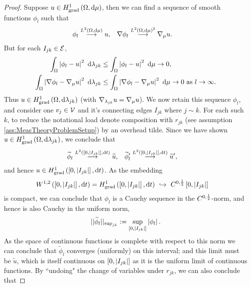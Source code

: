 \begin{proof}
	Suppose $u\in H^1_\mathrm{grad}\left( \Omega, \mathrm{d}\mu \right)$, then we can find a sequence of smooth functions $\phi_l$ such that
	\begin{align*}
		\phi_l \overset{L^{2}\left( \Omega,\mathrm{d}\mu \right)}{\longrightarrow} u, 
		&\quad \nabla\phi_l \overset{L^{2}\left( \Omega,\mathrm{d}\mu \right)^2}{\longrightarrow} \nabla_\mu u.
	\end{align*}
	But for each $I_{jk}\in \mathcal{E}$,
	\begin{align*}
		\int_{\Omega}\left\lvert  \phi_l - u  \right\rvert^2 \ \mathrm{d}\lambda_{jk}
		&\leq \int_{\Omega}\left\lvert  \phi_l - u  \right\rvert^2 \ \mathrm{d}\mu \rightarrow 0, \\
		\int_{\Omega}\left\lvert  \nabla\phi_l - \nabla_\mu u  \right\rvert^2 \ \mathrm{d}\lambda_{jk}
		&\leq \int_{\Omega}\left\lvert  \nabla\phi_l - \nabla_\mu u  \right\rvert^2 \ \mathrm{d}\mu \rightarrow 0 \ \text{as} \ l \rightarrow\infty.
	\end{align*}
	Thus $u\in H^1_\mathrm{grad}\left( \Omega, \mathrm{d}\lambda_{jk} \right)$ (with $\nabla_{\lambda_{jk}}u = \nabla_\mu u$).
	We now retain this sequence $\phi_l$, and consider one $v_j\in \mathcal{V}$ and it's connecting edges $I_{jk}$ where $j\sim k$.
	For each such $k$, to reduce the notational load denote composition with $r_{jk}$ (see assumption \ref{ass:MeasTheoryProblemSetup}) by an overhead tilde.
	Since we have shown $u\in H^1_\mathrm{grad}\left( \Omega, \mathrm{d}\lambda_{jk} \right)$, we conclude that 
	\begin{align*}
		\widetilde{\phi}_l \overset{L^{2}\left( \left[ 0,\left\lvert I_{jk} \right\rvert \right],\mathrm{d}t \right)}{\longrightarrow} \widetilde{u}, 
		&\quad \widetilde{\phi}'_l \overset{L^{2}\left( \left[ 0,\left\lvert I_{jk} \right\rvert \right],\mathrm{d}t \right)}{\longrightarrow} \widetilde{u}',
	\end{align*}
	and hence $u\in H^1_\mathrm{grad}\left( \left[ 0,\left\lvert I_{jk} \right\rvert \right], \mathrm{d}t \right)$.
	As the embedding 
	\begin{align*}
		W^{1,2}\bracs{\interval{I_{jk}}, \md t} = \gradSob{\interval{I_{jk}}}{t} \ &\hookrightarrow \ C^{0,\recip{2}}\interval{I_{jk}}
	\end{align*}
	is compact, we can conclude that $\phi_l$ is a Cauchy sequence in the $C^{0,\frac{1}{2}}$-norm, and hence is also Cauchy in the uniform norm,
	\begin{align*}
		\lvert\lvert \widetilde{\phi}_l \rvert\rvert_{\mathrm{sup}_{jk}} := \sup_{\left[ 0,\left\lvert I_{jk} \right\rvert \right]}\left\lvert \phi_l \right\rvert.
	\end{align*}
	As the space of continuous functions is complete with respect to this norm we can conclude that $\widetilde{\phi}_l$ converges (uniformly) on this interval; and this limit must be $\widetilde{u}$, which is itself continuous on $\left[ 0,\left\lvert I_{jk} \right\rvert \right]$ as it is the uniform limit of continuous functions.
	By ``undoing" the change of variables under $r_{jk}$, we can also conclude that

\end{proof}
